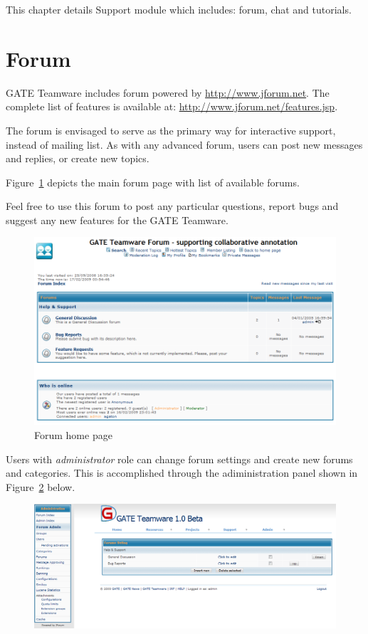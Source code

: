 This chapter details Support module which includes: forum, chat and tutorials.
\section{Forum}
GATE Teamware includes forum powered by \url{http://www.jforum.net}.
The complete list of features is available at:
\url{http://www.jforum.net/features.jsp}.

The forum is envisaged to serve as the primary way for interactive support, instead of mailing list.
As with any advanced forum, users can post new messages and replies, or create new topics. 

Figure~\ref{fig:forum} depicts the main forum page with list of available forums. 

Feel free to use this forum to post any particular questions, report bugs and suggest any new features for the GATE Teamware.
\begin{figure}[hb!]
\centering
\includegraphics[scale=0.4]{forum}
\caption{Forum home page}
\label{fig:forum}
\end{figure}

Users with \emph{administrator} role can change forum settings and create new forums and categories. This is accomplished through the adiministration panel shown in Figure~\ref{fig:forumadmin} below.

\begin{figure}
\centering
\includegraphics[scale=0.4]{forumadmin}
\label{fig:forumadmin}
\end{figure}

